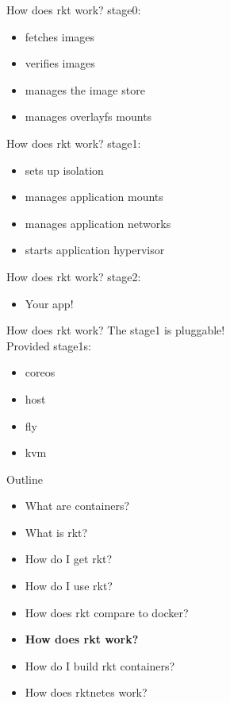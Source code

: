\documentclass[pdf,aspectratio=169,14pt]{beamer}
\begin{document}
\begin{frame}{How does rkt work?}
    stage0:
    \begin{itemize}
        \item fetches images
        \item verifies images
        \item manages the image store
        \item manages overlayfs mounts
    \end{itemize}
\end{frame}

\begin{frame}{How does rkt work?}
    stage1:
    \begin{itemize}
        \item sets up isolation
        \item manages application mounts
        \item manages application networks
        \item starts application hypervisor
    \end{itemize}
\end{frame}

\begin{frame}{How does rkt work?}
    stage2:
    \begin{itemize}
        \item Your app!
    \end{itemize}
\end{frame}

\begin{frame}{How does rkt work?}
    The stage1 is pluggable! \\
    \pause
    \vspace{1em}
    Provided stage1s:
    \begin{itemize}
        \item coreos
        \item host
        \pause
        \item fly
        \pause
        \item kvm
    \end{itemize}
\end{frame}



\begin{frame}
    Outline
    \begin{itemize}
        \item What are containers?
        \item What is rkt?
        \item How do I get rkt?
        \item How do I use rkt?
        \item How does rkt compare to docker?
        \item \textbf{How does rkt work?}
        \item How do I build rkt containers?
        \item How does rktnetes work?
    \end{itemize}
\end{frame}
\end{document}
